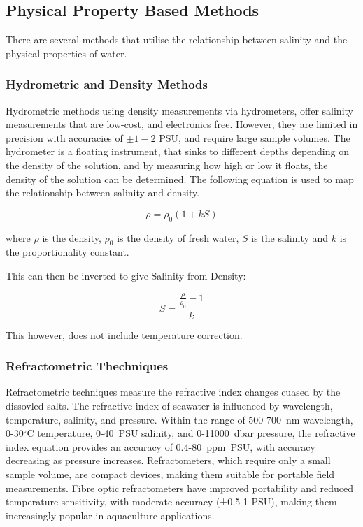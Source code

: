 \subsection{Physical Property Based Methods}
There are several methods that utilise the relationship between salinity and the physical properties of water.

\subsubsection{Hydrometric and Density Methods}
Hydrometric methods using density measurements via hydrometers, offer salinity measurements that are low-cost, and electronics free. 
However, they are limited in precision with accuracies of $\pm 1-2$ PSU, and require large sample volumes.
The hydrometer is a floating instrument, that sinks to different depths depending on the density of the solution, and by measuring how high or low it floats, the density of the solution can be determined.
The following equation is used to map the relationship between salinity and density.

\begin{equation}
    \rho = \rho_0(1+kS)
\end{equation}

where $\rho$ is the density, $\rho_0$ is the density of fresh water, $S$ is the salinity and $k$ is the proportionality constant. 

This can then be inverted to give Salinity from Density:

\begin{equation}
S = \frac{\frac{\rho}{\rho_0}-1}{k}
\end{equation}

This however, does not include temperature correction.

\subsubsection{Refractometric Thechniques}
Refractometric techniques measure the refractive index changes cuased by the dissovled salts.
The refractive index of seawater is influenced by wavelength, temperature, salinity, and pressure. 
Within the range of 500-700~nm wavelength, 0-30$^\circ$C temperature, 0-40~PSU salinity, and 0-11000~dbar pressure, the refractive index equation provides an accuracy of 0.4-80~ppm~PSU, with accuracy decreasing as pressure increases.
Refractometers, which require only a small sample volume, are compact devices, making them suitable for portable field measurements.
Fibre optic refractometers have improved portability and reduced temperature sensitivity, with moderate accuracy (±0.5-1 PSU), making them increasingly popular in aquaculture applications. 


